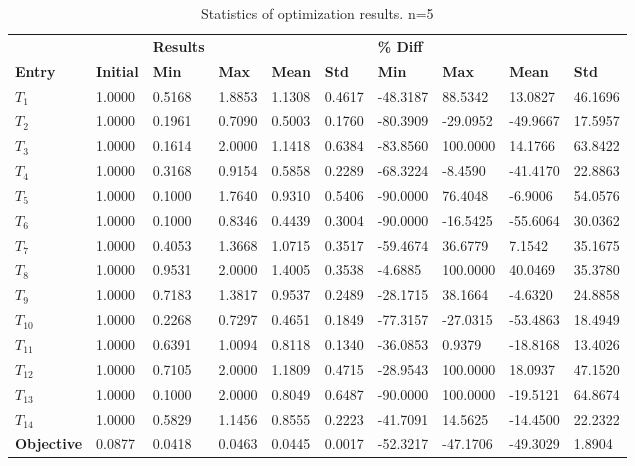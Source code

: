 \begin{table}[H]
\centering
\begin{tabular}{llllllllll}
\textbf{} & \textbf{} & \cellcolor[HTML]{EFEFEF}\textbf{Results} & \cellcolor[HTML]{EFEFEF} & \cellcolor[HTML]{EFEFEF} & \cellcolor[HTML]{EFEFEF} & \cellcolor[HTML]{EFEFEF}\textbf{\% Diff} & \cellcolor[HTML]{EFEFEF} & \cellcolor[HTML]{EFEFEF} & \cellcolor[HTML]{EFEFEF} \\
\rowcolor[HTML]{EFEFEF} 
\textbf{Entry} & \textbf{Initial} & \textbf{Min} & \textbf{Max} & \textbf{Mean} & \textbf{Std} & \textbf{Min} & \textbf{Max} & \textbf{Mean} & \textbf{Std} \\
$T_1$ & 1.0000 & 0.5168 & 1.8853 & 1.1308 & 0.4617 & -48.3187 & 88.5342 & 13.0827 & 46.1696 \\ 
$T_2$ & 1.0000 & 0.1961 & 0.7090 & 0.5003 & 0.1760 & -80.3909 & -29.0952 & -49.9667 & 17.5957 \\ 
$T_3$ & 1.0000 & 0.1614 & 2.0000 & 1.1418 & 0.6384 & -83.8560 & 100.0000 & 14.1766 & 63.8422 \\ 
$T_4$ & 1.0000 & 0.3168 & 0.9154 & 0.5858 & 0.2289 & -68.3224 & -8.4590 & -41.4170 & 22.8863 \\ 
$T_5$ & 1.0000 & 0.1000 & 1.7640 & 0.9310 & 0.5406 & -90.0000 & 76.4048 & -6.9006 & 54.0576 \\ 
$T_6$ & 1.0000 & 0.1000 & 0.8346 & 0.4439 & 0.3004 & -90.0000 & -16.5425 & -55.6064 & 30.0362 \\ 
$T_7$ & 1.0000 & 0.4053 & 1.3668 & 1.0715 & 0.3517 & -59.4674 & 36.6779 & 7.1542 & 35.1675 \\ 
$T_8$ & 1.0000 & 0.9531 & 2.0000 & 1.4005 & 0.3538 & -4.6885 & 100.0000 & 40.0469 & 35.3780 \\ 
$T_9$ & 1.0000 & 0.7183 & 1.3817 & 0.9537 & 0.2489 & -28.1715 & 38.1664 & -4.6320 & 24.8858 \\ 
$T_10$ & 1.0000 & 0.2268 & 0.7297 & 0.4651 & 0.1849 & -77.3157 & -27.0315 & -53.4863 & 18.4949 \\ 
$T_11$ & 1.0000 & 0.6391 & 1.0094 & 0.8118 & 0.1340 & -36.0853 & 0.9379 & -18.8168 & 13.4026 \\ 
$T_12$ & 1.0000 & 0.7105 & 2.0000 & 1.1809 & 0.4715 & -28.9543 & 100.0000 & 18.0937 & 47.1520 \\ 
$T_13$ & 1.0000 & 0.1000 & 2.0000 & 0.8049 & 0.6487 & -90.0000 & 100.0000 & -19.5121 & 64.8674 \\ 
$T_14$ & 1.0000 & 0.5829 & 1.1456 & 0.8555 & 0.2223 & -41.7091 & 14.5625 & -14.4500 & 22.2322 \\ 
\rowcolor[HTML]{EFEFEF} 
\textbf{Objective} & 0.0877 & 0.0418 & 0.0463 & 0.0445 & 0.0017 & -52.3217 & -47.1706 & -49.3029 & 1.8904 \\ 
\end{tabular}
\caption{Statistics of optimization results. n=5}
\label{tab:StatisticsOptimizationAnalysis}
\end{table}